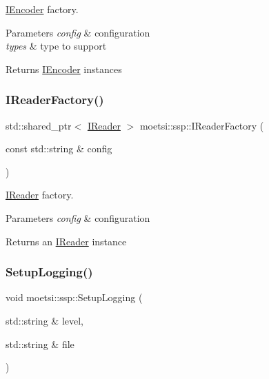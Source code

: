 \hyperlink{classmoetsi_1_1ssp_1_1IEncoder}{I\+Encoder} factory. 


\begin{DoxyParams}{Parameters}
{\em config} & configuration \\
\hline
{\em types} & type to support \\
\hline
\end{DoxyParams}
\begin{DoxyReturn}{Returns}
\hyperlink{classmoetsi_1_1ssp_1_1IEncoder}{I\+Encoder} instances 
\end{DoxyReturn}
\mbox{\label{namespacemoetsi_1_1ssp_ad5e820c4c6a1a43d5e85608a06b86ea8}} 
\subsubsection{\texorpdfstring{I\+Reader\+Factory()}{IReaderFactory()}}
{\footnotesize\ttfamily std\+::shared\+\_\+ptr$<$ \hyperlink{classmoetsi_1_1ssp_1_1IReader}{I\+Reader} $>$ moetsi\+::ssp\+::\+I\+Reader\+Factory (\begin{DoxyParamCaption}\item[{const std\+::string \&}]{config }\end{DoxyParamCaption})}



\hyperlink{classmoetsi_1_1ssp_1_1IReader}{I\+Reader} factory. 


\begin{DoxyParams}{Parameters}
{\em config} & configuration \\
\hline
\end{DoxyParams}
\begin{DoxyReturn}{Returns}
an \hyperlink{classmoetsi_1_1ssp_1_1IReader}{I\+Reader} instance 
\end{DoxyReturn}
\mbox{\label{namespacemoetsi_1_1ssp_a0af356ab87e92f92c49e7118b9cb1ba2}} 
\subsubsection{\texorpdfstring{Setup\+Logging()}{SetupLogging()}\hspace{0.1cm}{\footnotesize\ttfamily [1/2]}}
{\footnotesize\ttfamily void moetsi\+::ssp\+::\+Setup\+Logging (\begin{DoxyParamCaption}\item[{std\+::string \&}]{level,  }\item[{std\+::string \&}]{file }\end{DoxyParamCaption})}



